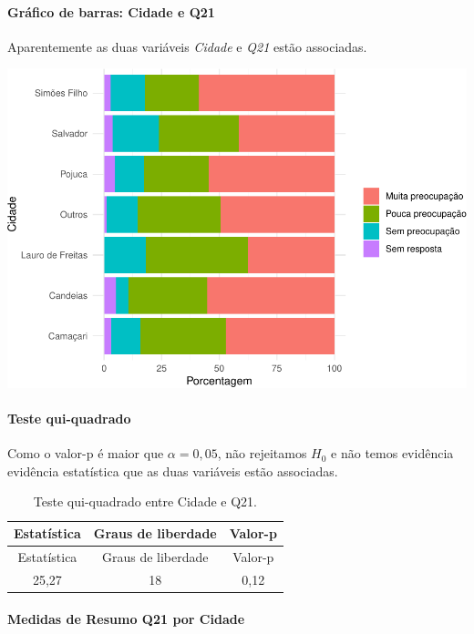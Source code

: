 \documentclass[]{article}
\let\oldparagraph\paragraph
\renewcommand{\paragraph}[1]{\oldparagraph{#1}\mbox{}}
\begin{document}
\hypertarget{gruxe1fico-de-barras-cidade-e-q21}{%
\paragraph{Gráfico de barras: Cidade e Q21}\label{gruxe1fico-de-barras-cidade-e-q21}}

Aparentemente as duas variáveis \emph{Cidade} e \emph{Q21} estão associadas.

\begin{center}\includegraphics[width=0.75\linewidth]{relatorio_files/figure-latex/unnamed-chunk-327-1} \end{center}

\hypertarget{teste-qui-quadrado-37}{%
\paragraph{Teste qui-quadrado}\label{teste-qui-quadrado-37}}

Como o valor-p é maior que \(\alpha=0,05\), não rejeitamos \(H_0\) e não temos evidência evidência estatística que as duas variáveis estão associadas.

\begin{longtable}[]{@{}ccc@{}}
\caption{\label{tab:unnamed-chunk-328}Teste qui-quadrado entre Cidade e Q21.}\tabularnewline
\toprule
Estatística & Graus de liberdade & Valor-p\tabularnewline
\midrule
\endfirsthead
\toprule
Estatística & Graus de liberdade & Valor-p\tabularnewline
\midrule
\endhead
25,27 & 18 & 0,12\tabularnewline
\bottomrule
\end{longtable}

\cleardoublepage

\hypertarget{medidas-de-resumo-q21-por-cidade}{%
\paragraph{Medidas de Resumo Q21 por Cidade}\label{medidas-de-resumo-q21-por-cidade}}
\end{document}
